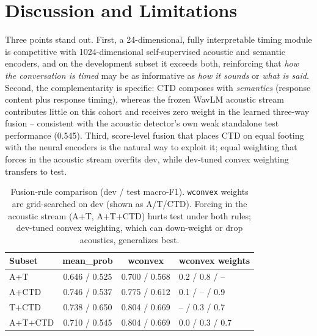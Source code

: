 \documentclass{article}
\begin{document}
\section{Discussion and Limitations}
\vspace{-1mm}
\label{sec:discussion}
Three points stand out. First, a 24-dimensional, fully interpretable timing module is competitive with 1024-dimensional self-supervised acoustic and semantic encoders, and on the development subset it exceeds both, reinforcing that \emph{how the conversation is timed} may be as informative as \emph{how it sounds} or \emph{what is said}. Second, the complementarity is specific: CTD composes with \emph{semantics} (response content plus response timing), whereas the frozen WavLM acoustic stream contributes little on this cohort and receives zero weight in the learned three-way fusion -- consistent with the acoustic detector's own weak standalone test performance (0.545). Third, score-level fusion that places CTD on equal footing with the neural encoders is the natural way to exploit it; equal weighting that forces in the acoustic stream overfits dev, while dev-tuned convex weighting transfers to test.


\begin{table}[!t]
\centering
\caption{Fusion-rule comparison (dev / test macro-F1). \texttt{wconvex} weights are grid-searched on dev (shown as A/T/CTD). Forcing in the acoustic stream (A+T, A+T+CTD) hurts test under both rules; dev-tuned convex weighting, which can down-weight or drop acoustics, generalizes best.}
\label{tab:strategies}
\begin{tabular}{l cc l}
\toprule
Subset & mean\_prob & wconvex & wconvex weights \\
\midrule
A+T       & 0.646 / 0.525 & 0.700 / 0.568 & 0.2 / 0.8 / -- \\
A+CTD     & 0.746 / 0.537 & 0.775 / 0.612 & 0.1 / -- / 0.9 \\
T+CTD     & 0.738 / 0.650 & 0.804 / 0.669 & -- / 0.3 / 0.7 \\
A+T+CTD   & 0.710 / 0.545 & 0.804 / 0.669 & 0.0 / 0.3 / 0.7 \\
\bottomrule
\end{tabular}
\vspace{-4mm}
\end{table}
\end{document}
